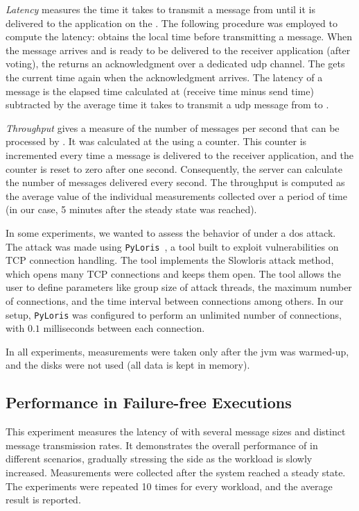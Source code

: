 \emph{Latency} measures the time it takes to transmit a message from \sender until it is delivered to the application on the \postsieve. 
The following procedure was employed to compute the latency: \sender obtains the local time before transmitting a message. 
When the message arrives and is ready to be delivered to the receiver application (after voting), the \postsieve returns an acknowledgment over a dedicated \gls{udp} channel.
The \Sender gets the current time again when the acknowledgment arrives. 
The latency of a message is the elapsed time calculated at \sender (receive time minus send time) subtracted by the average time it takes to transmit a \gls{udp} message from \postsieve to \sender.

\emph{Throughput} gives a measure of the number of messages per second that can be processed by \sieveq. 
It was calculated at the \postsieve using a counter. 
This counter is incremented every time a message is delivered to the receiver application, and the counter is reset to zero after one second. 
Consequently, the server can calculate the number of messages delivered every second. 
The throughput is computed as the average value of the individual measurements collected over a period of time (in our case, 5 minutes after the steady state was reached).

In some experiments, we wanted to assess the behavior of \sieveq under a \gls{dos} attack. 
The attack was made using \texttt{PyLoris}~\cite{pyloris}, a tool built to exploit vulnerabilities on TCP connection handling.
The tool implements the Slowloris attack method, which opens many TCP connections and keeps them open.
The tool allows the user to define parameters like group size of attack threads, the maximum number of connections, and the time interval between connections among others.
In our setup, \texttt{PyLoris} was configured to perform an unlimited number of connections, with $0.1$ milliseconds between each connection.

In all experiments, measurements were taken only after the \gls{jvm} was warmed-up, and the disks were not used (all data is kept in memory).


\subsection{Performance in Failure-free Executions}
\label{throughput_latency}

This experiment measures the latency of \sieveq with several message sizes and distinct message transmission rates. 
It demonstrates the overall performance of \sieveq in different scenarios, gradually stressing the \postsieve side as the workload is slowly increased. 
Measurements were collected after the system reached a steady state. 
The experiments were repeated 10 times for every workload, and the average result is reported.

